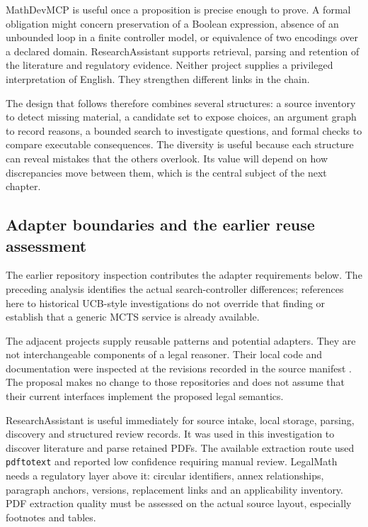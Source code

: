 \documentclass[12pt,a4paper,oneside,openany]{book}
\begin{document}
MathDevMCP is useful once a proposition is precise enough to prove. A formal
obligation might concern preservation of a Boolean expression, absence of an
unbounded loop in a finite controller model, or equivalence of two encodings over
a declared domain. ResearchAssistant supports retrieval, parsing and retention
of the literature and regulatory evidence. Neither project supplies a privileged
interpretation of English. They strengthen different links in the chain.

The design that follows therefore combines several structures: a source inventory
to detect missing material, a candidate set to expose choices, an argument graph
to record reasons, a bounded search to investigate questions, and formal checks
to compare executable consequences. The diversity is useful because each
structure can reveal mistakes that the others overlook. Its value will depend on
how discrepancies move between them, which is the central subject of the next
chapter.

\subsection{Adapter boundaries and the earlier reuse assessment}

The earlier repository inspection contributes the adapter requirements below.
The preceding analysis identifies the actual search-controller differences;
references here to historical UCB-style investigations do not override that
finding or establish that a generic MCTS service is already available.


\label{merge:P-04-prototype:03}


The adjacent projects supply reusable patterns and potential adapters. They are
not interchangeable components of a legal reasoner. Their local code and
documentation were inspected at the revisions recorded in the source manifest
\citep{localrepos}. The proposal makes no change to those repositories and does
not assume that their current interfaces implement the proposed legal semantics.

ResearchAssistant is useful immediately for source intake, local storage, parsing,
discovery and structured review records. It was used in this investigation to
discover literature and parse retained PDFs. The available extraction route used
\texttt{pdftotext} and reported low confidence requiring manual review. LegalMath
needs a regulatory layer above it: circular identifiers, annex relationships,
paragraph anchors, versions, replacement links and an applicability inventory.
PDF extraction quality must be assessed on the actual source layout, especially
footnotes and tables.
\end{document}
